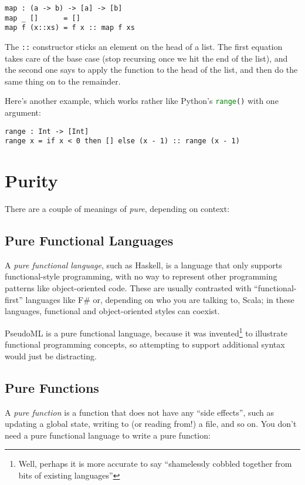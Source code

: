 \documentclass{book}
\newcommand{\mlil}[1]{\lstinline[language=pseudoml,columns=fixed]|#1|}\usepackage{caption}
\begin{document}
\begin{lstlisting}[language=pseudoml]
map : (a -> b) -> [a] -> [b]
map _ []      = []
map f (x::xs) = f x :: map f xs
\end{lstlisting}

The \mlil{::} constructor sticks an element on the head of a list. The first equation takes care of the base case (stop recursing once we hit the end of the list), and the second one says to apply the function to the head of the list, and then do the same thing on to the remainder.

Here's another example, which works rather like Python's \lstinline[language=python]!range()! with one argument:

\begin{lstlisting}[language=pseudoml]
range : Int -> [Int]
range x = if x < 0 then [] else (x - 1) :: range (x - 1)
\end{lstlisting}

\section{Purity}\label{sec:purity}

There are a couple of meanings of \emph{pure}, depending on context:

\subsection{Pure Functional Languages}

A \emph{pure functional language}, such as Haskell, is a language that only supports functional-style programming, with no way to represent other programming patterns like object-oriented code. These are usually contrasted with ``functional-first'' languages like F\# or, depending on who you are talking to, Scala; in these languages, functional and object-oriented styles can coexist.

PseudoML is a pure functional language, because it was invented\footnote{Well, perhaps it is more accurate to say ``shamelessly cobbled together from bits of existing languages''} to illustrate functional programming concepts, so attempting to support additional syntax would just be distracting.

\subsection{Pure Functions}

A \emph{pure function} is a function that does not have any ``side effects'', such as updating a global state, writing to (or reading from!) a file, and so on. You don't need a pure functional language to write a pure function:
\end{document}
